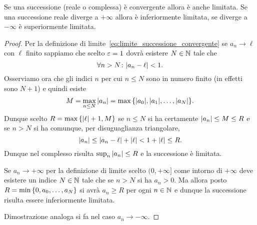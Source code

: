 \begin{theorem}
\mymark{**}%
Se una successione (reale o complessa) è convergente allora è anche limitata.
Se una successione reale diverge a $+\infty$ allora è inferiormente limitata,
se diverge a $-\infty$ è superiormente limitata.
\end{theorem}
%
\begin{proof}
  Per la definizione di limite~\eqref{eq:limite_successione_convergente} 
  se $a_n\to \ell$ con $\ell$ finito sappiamo 
  che scelto $\varepsilon=1$ dovrà esistere $N\in {\mathbb N}$ tale che 
  \[
      \forall n>N\colon {\left|a_n - \ell\right|} < 1.
  \]
  Osserviamo ora che gli indici $n$ per cui $n\le N$ sono in numero finito 
  (in effetti sono $N+1$) e quindi esiste
  \[
   M = \max_{n\le N} {\left|a_n\right|} 
   = \max {\left\{ {\left|a_0\right|}, {\left|a_1\right|}, \dots , {\left|a_N\right|} \right\}}.  
  \]
  Dunque scelto $R=\max{\left\{ {\left|\ell\right|}+1,M \right\}}$ 
  se $n\le N$ si ha certamente ${\left|a_n\right|}\le M \le R$
  e se $n>N$ si ha comunque, per disuguaglianza triangolare,
  \[
  {\left|a_n\right|} \le {\left|a_n-\ell\right|} + {\left|\ell\right|} < 1+ {\left|\ell\right|} \le R.  
  \]
  Dunque nel complesso risulta $\sup_n {\left|a_n\right|}\le R$ e la successione 
  è limitata.

  Se $a_n\to +\infty$ per la definizione di limite 
  scelto $(0,+\infty]$ come intorno di $+\infty$ 
  deve esistere un indice $N\in {\mathbb N}$ tale che se $n>N$ si ha $a_n>0$. 
  Ma allora posto $R=\min{\left\{ 0, a_0,\dots,a_N \right\}}$
  si avrà $a_n\ge R$ per ogni $n\in {\mathbb N}$ e dunque la successione 
  risulta essere inferiormente limitata.

  Dimostrazione analoga si fa nel caso $a_n\to -\infty$.
\end{proof}


%

